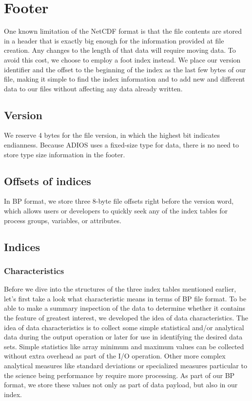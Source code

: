 \section{Footer}

One known limitation of the NetCDF format is that the file contents are stored 
in a header that is exactly big enough for the information provided at file creation. 
Any changes to the length of that data will require moving data. To avoid this 
cost, we choose to employ a foot index instead. We place our version identifier 
and the offset to the beginning of the index as the last few bytes of our file, 
making it simple to find the index information and to add new and different data 
to our files without affecting any data already written. 

\subsection{Version}

We reserve 4 bytes for the file version, in which the highest bit indicates endianness. 
Because ADIOS uses a fixed-size type for data, there is no need to store type size 
information in the footer. 

\subsection{Offsets of indices}

In BP format, we store three 8-byte file offsets right before the version word, 
which allows users or developers to quickly seek any of the index tables for process 
groups, variables, or attributes. 

\subsection{Indices}

\subsubsection{Characteristics}

Before we dive into the structures of the three index tables mentioned earlier, 
let's first take a look what characteristic means in terms of BP file format. To 
be able to make a summary inspection of the data to determine whether it contains 
the feature of greatest interest, we developed the idea of data characteristics. 
The idea of data characteristics is to collect some simple statistical and/or analytical 
data during the output operation or later for use in identifying the desired data 
sets. Simple statistics like array minimum and maximum values can be collected 
without extra overhead as part of the I/O operation. Other more complex analytical 
measures like standard deviations or specialized measures particular to the science 
being performance by require more processing. As part of our BP format, we store 
these values not only as part of data payload, but also in our index. 

